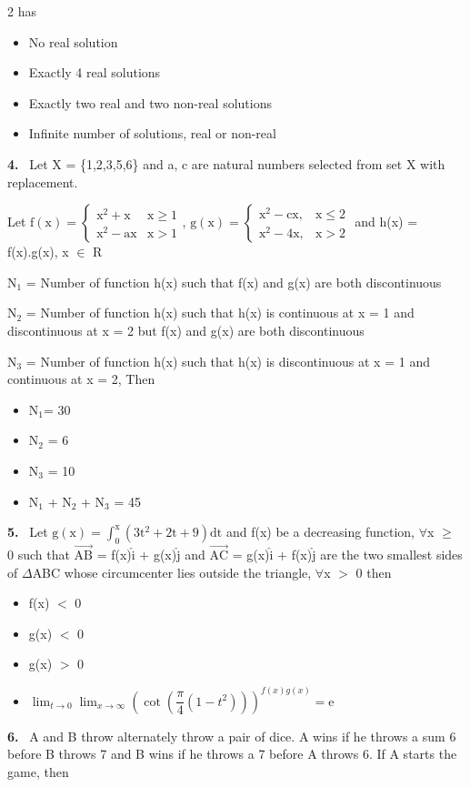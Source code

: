 \documentclass[10pt]{extarticle}
\newcommand{\qn}[1]{\par\smallskip\noindent\textbf{#1.}~}
\newenvironment{qoptions}{\begin{itemize}[leftmargin=1.8em,itemsep=1pt,topsep=2pt,label={}]}{\end{itemize}}
\newcommand{\opt}[2]{\item[(#1)] #2}
\begin{document}
\begin{multicols}{2}
has
\begin{qoptions}
\opt{A}{No real solution}
\opt{B}{Exactly 4 real solutions}
\opt{C}{Exactly two real and two non-real solutions}
\opt{D}{Infinite number of solutions, real or non-real}
\end{qoptions}
\qn{4} Let X = \{1,2,3,5,6\} and a, c are natural numbers selected from set X with replacement.\par
Let $\mathrm f(\mathrm x)=\begin{cases}\mathrm x^2+\mathrm x&\mathrm x\geqslant1\\\mathrm x^2-\mathrm{ax}&\mathrm x>1\end{cases}$, $\mathrm g(\mathrm x)=\begin{cases}\mathrm x^2-\mathrm{cx},&\mathrm x\leqslant2\\\mathrm x^2-4\mathrm x,&\mathrm x>2\end{cases}$ and h(x) = f(x).g(x), x $\in$ R\par
N$_1$ = Number of function h(x) such that f(x) and g(x) are both discontinuous\par
N$_2$ = Number of function h(x) such that h(x) is continuous at x = 1 and discontinuous at x = 2 but f(x) and g(x) are both discontinuous\par
N$_3$ = Number of function h(x) such that h(x) is discontinuous at x = 1 and continuous at x = 2, Then
\begin{qoptions}
\opt{A}{N$_1$= 30}
\opt{B}{N$_2$ = 6}
\opt{C}{N$_3$ = 10}
\opt{D}{N$_1$ + N$_2$ + N$_3$ = 45}
\end{qoptions}
\qn{5} Let $\mathrm g(\mathrm x)=\displaystyle\int_0^{\mathrm x}\left(3\mathrm t^2+2\mathrm t+9\right)\mathrm{dt}$ and f(x) be a decreasing function, $\forall$x $\geqslant$ 0 such that $\overrightarrow{\mathrm{AB}}$ = f(x)$\hat{\mathrm i}$ + g(x)$\hat{\mathrm j}$ and $\overrightarrow{\mathrm{AC}}$ = g(x)$\hat{\mathrm i}$ + f(x)$\hat{\mathrm j}$ are the two smallest sides of $\Delta$ABC whose circumcenter lies outside the triangle, $\forall$x $>$ 0 then
\begin{qoptions}
\opt{A}{f(x) $<$ 0}
\opt{B}{g(x) $<$ 0}
\opt{C}{g(x) $>$ 0}
\opt{D}{$\displaystyle\lim_{t\to0}\lim_{x\to\infty}\left(\cot\left(\dfrac\pi4\left(1-t^2\right)\right)\right)^{f(x)g(x)}=\mathrm e$}
\end{qoptions}
\qn{6} A and B throw alternately throw a pair of dice. A wins if he throws a sum 6 before B throws 7 and B wins if he throws a 7 before A throws 6. If A starts the game, then
\begin{qoptions}

\end{qoptions}
\end{multicols}
\end{document}

